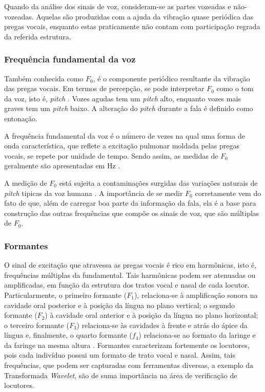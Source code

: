 			\par Quando da análise dos sinais de voz, consideram-se as partes vozeadas e não-vozeadas. Aquelas são produzidas com a ajuda da vibração quase periódica das pregas vocais, enquanto estas praticamente não contam com participação regrada da referida estrutura.
			
			\subsubsection{Frequência fundamental da voz}
				\par Também conhecida como $F_0$, é o componente periódico resultante da vibração das pregas vocais. Em termos de percepção, se pode interpretar $F_0$ como o tom da voz, isto é, \textit{pitch} \cite{kremer2014eficiencia}. Vozes agudas tem um \textit{pitch} alto, enquanto vozes mais graves tem um \textit{pitch} baixo. A alteração do \textit{pitch} durante a fala é definido como entonação.
				
				\par A frequência fundamental da voz é o número de vezes na qual uma forma de onda característica, que reflete a excitação pulmonar moldada pelas pregas vocais, se repete por unidade de tempo. Sendo assim, as medidas de $F_0$ geralmente são apresentadas em Hz \cite{freitas2013avaliaccao}.
			
				\par A medição de $F_0$ está sujeita a contaminações surgidas das variações naturais de \textit{pitch} tipicas da voz humana \cite{freitas2013avaliaccao}. A importância de se medir $F_0$ corretamente vem do fato de que, além de carregar boa parte da informação da fala, ela é a base para construção das outras frequências que compõe os sinais de voz, que são múltiplas de $F_0$.
				
				\subsubsection{Formantes}
					\par O sinal de excitação que atravessa as pregas vocais é rico em harmônicas, isto é, frequências múltiplas da fundamental. Tais harmônicas podem ser atenuadas ou amplificadas, em função da estrutura dos tratos vocal e nasal de cada locutor. Particularmente, o primeiro formante ($F_1$), relaciona-se à  amplificação  sonora  na  cavidade  oral  posterior  e  à  posição  da  língua  no  plano  vertical;  o segundo  formante  ($F_2$)  à  cavidade  oral  anterior  e  à  posição  da  língua  no  plano  horizontal; o terceiro  formante  ($F_3$)  relaciona-se  às  cavidades  à  frente  e  atrás  do  ápice  da  língua e, finalmente,  o  quarto formante  ($f_4$) relaciona-se  ao  formato  da  laringe  e  da  faringe  na  mesma  altura  \cite{valencca2014analise}. Formantes caracterizam fortemente os locutores, pois cada indivíduo possui um formato de trato vocal e nasal. Assim, tais frequências, que podem ser capturadas com ferramentas diversas, a exemplo da Transformada \textit{Wavelet}, são de suma importância na área de verificação de locutores.

